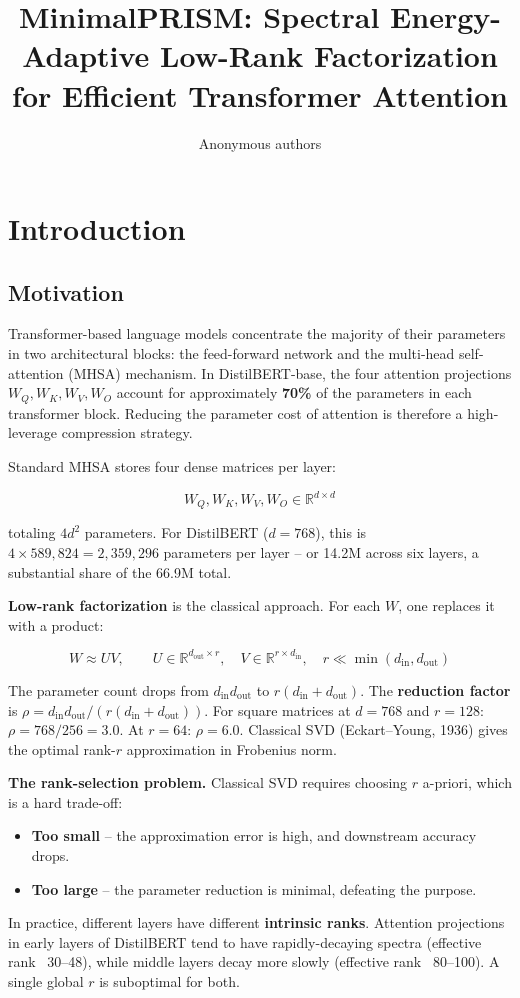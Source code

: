 \title{\textbf{MinimalPRISM: Spectral Energy-Adaptive Low-Rank Factorization for Efficient Transformer Attention}}

\author{Anonymous authors}



\section{Introduction}

\subsection{Motivation}

Transformer-based language models concentrate the majority of their parameters 
in two architectural blocks: the feed-forward network and the multi-head 
self-attention (MHSA) mechanism. In DistilBERT-base, the four attention 
projections $W_Q, W_K, W_V, W_O$ account for approximately \textbf{70\%} of the 
parameters in each transformer block. Reducing the parameter cost of attention 
is therefore a high-leverage compression strategy.

Standard MHSA stores four dense matrices per layer:

\[
W_Q, W_K, W_V, W_O \in \mathbb{R}^{d \times d}
\tag{1.1}
\]

totaling $4d^2$ parameters. For DistilBERT ($d = 768$), this is $4 \times 589{,}824 = 2{,}359{,}296$ 
parameters per layer -- or 14.2M across six layers, a substantial share of the 
66.9M total.

\textbf{Low-rank factorization} is the classical approach. For each $W$, one 
replaces it with a product:

\[
W \approx U V, \qquad
U \in \mathbb{R}^{d_\text{out} \times r}, \quad
V \in \mathbb{R}^{r \times d_\text{in}}, \quad r \ll \min(d_\text{in}, d_\text{out})
\tag{1.2}
\]

The parameter count drops from $d_\text{in} d_\text{out}$ to 
$r(d_\text{in} + d_\text{out})$. The \textbf{reduction factor} is 
$\rho = d_\text{in} d_\text{out} / (r(d_\text{in} + d_\text{out}))$. For square 
matrices at $d = 768$ and $r = 128$: $\rho = 768 / 256 = 3.0$. At $r = 64$: 
$\rho = 6.0$. Classical SVD (Eckart--Young, 1936) gives the optimal rank-$r$ 
approximation in Frobenius norm.

\textbf{The rank-selection problem.} Classical SVD requires choosing $r$ 
a-priori, which is a hard trade-off:

\begin{itemize}
\item \textbf{Too small} -- the approximation error is high, and downstream accuracy
  drops.
\item \textbf{Too large} -- the parameter reduction is minimal, defeating the purpose.

\end{itemize}
In practice, different layers have different \textbf{intrinsic ranks}. Attention 
projections in early layers of DistilBERT tend to have rapidly-decaying 
spectra (effective rank ~30--48), while middle layers decay more slowly 
(effective rank ~80--100). A single global $r$ is suboptimal for both.

